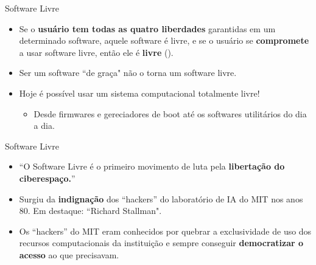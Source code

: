 \documentclass{beamer}
\begin{document}
\begin{frame}{Software Livre}
    \begin{itemize}
        \item Se o \textbf{usuário tem todas as quatro liberdades} garantidas em um determinado software, aquele software é livre, e se o usuário se \textbf{compromete} a usar software livre, então ele é \textbf{livre} (\cite{RTC2009}).
        \item Ser um software ``de graça" não o torna um software livre.
        \item Hoje é possível usar um sistema computacional totalmente livre!
        \begin{itemize}
            \item Desde firmwares e gereciadores de boot até os softwares utilitários do dia a dia.
        \end{itemize}
    \end{itemize}
\end{frame}

\begin{frame}{Software Livre}
    \begin{itemize}
        \item ``O Software Livre é o primeiro movimento de luta pela \textbf{libertação do ciberespaço.}''
        \item Surgiu da \textbf{indignação} dos ``hackers'' do laboratório de IA do MIT nos anos 80. Em destaque: ``Richard Stallman".
        \item Os ``hackers'' do MIT eram conhecidos por quebrar a exclusividade de uso dos recursos computacionais da instituição e sempre conseguir \textbf{democratizar o acesso} ao que precisavam.
    \end{itemize}    
\end{frame}
\end{document}
